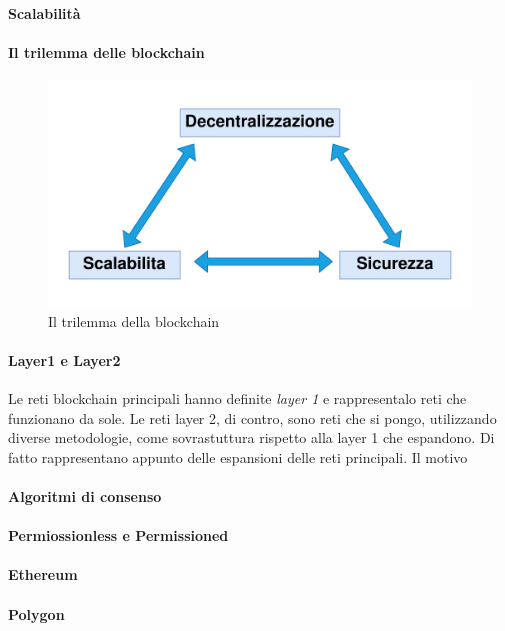 \documentclass[a4paper,11pt]{article}
\begin{document}
\paragraph{Scalabilità}
\paragraph{Il trilemma delle blockchain}
\begin{figure}[h!]
  \includegraphics[width=1\linewidth]{img/trilemma.png}
  \caption{Il trilemma della blockchain}
  \label{fig:trilemma}
\end{figure}

\paragraph{Layer1 e Layer2}
Le reti blockchain principali hanno definite \textit{layer 1} e rappresentalo reti che funzionano da sole. Le reti layer 2, di contro, sono reti che si pongo, utilizzando diverse metodologie, come sovrastuttura rispetto alla layer 1 che espandono. Di fatto rappresentano appunto delle espansioni delle reti principali. Il motivo
\paragraph{Algoritmi di consenso}
\paragraph{Permiossionless e Permissioned}
\paragraph{Ethereum}
\paragraph{Polygon}
\end{document}
